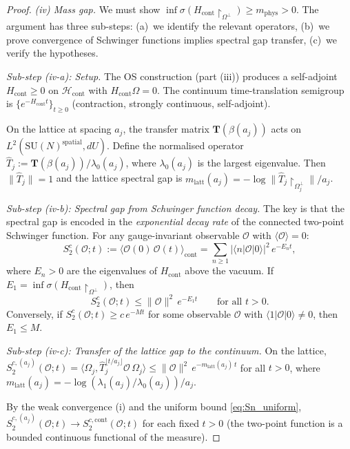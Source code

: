 \documentclass[11pt,a4paper]{amsart}
\theoremstyle{definition}
\newcommand{\SU}{\mathrm{SU}}
\begin{document}
\begin{proof}
\emph{(iv) Mass gap.}
We must show $\inf\sigma(H_{\mathrm{cont}}\restriction_{\Omega^\perp})
\ge m_{\mathrm{phys}} > 0$.
The argument has three sub-steps: (a)~we identify the relevant operators,
(b)~we prove convergence of Schwinger functions implies spectral gap transfer,
(c)~we verify the hypotheses.

\emph{Sub-step (iv-a): Setup.}
The OS construction (part (iii)) produces a self-adjoint $H_{\mathrm{cont}} \ge 0$
on $\mathcal{H}_{\mathrm{cont}}$ with $H_{\mathrm{cont}}\Omega = 0$.
The continuum time-translation semigroup is
$\{e^{-H_{\mathrm{cont}} t}\}_{t\ge 0}$ (contraction, strongly continuous,
self-adjoint).

On the lattice at spacing $a_j$, the transfer matrix $\mathbf{T}(\beta(a_j))$
acts on $L^2(\SU(N)^{\mathrm{spatial}}, dU)$.  Define the normalised operator
$\hat{T}_j := \mathbf{T}(\beta(a_j))/\lambda_0(a_j)$, where $\lambda_0(a_j)$
is the largest eigenvalue.  Then $\|\hat{T}_j\| = 1$ and the lattice
spectral gap is $m_{\mathrm{latt}}(a_j) = -\log\|\hat{T}_j\restriction_{\Omega_j^\perp}\|/a_j$.

\emph{Sub-step (iv-b): Spectral gap from Schwinger function decay.}
The key is that the spectral gap is encoded in the \emph{exponential decay rate}
of the connected two-point Schwinger function.  For any gauge-invariant
observable $\mathcal{O}$ with $\langle\mathcal{O}\rangle = 0$:
\[
  S_2^c(\mathcal{O}; t)
  := \langle \mathcal{O}(0)\,\mathcal{O}(t)\rangle_{\mathrm{cont}}
  = \sum_{n\ge 1} |\langle n|\mathcal{O}|0\rangle|^2\, e^{-E_n t},
\]
where $E_n > 0$ are the eigenvalues of $H_{\mathrm{cont}}$ above the vacuum.
If $E_1 = \inf\sigma(H_{\mathrm{cont}}\restriction_{\Omega^\perp})$, then
\begin{equation}\label{eq:S2_gap_bound}
  S_2^c(\mathcal{O}; t) \le \|\mathcal{O}\|^2\, e^{-E_1 t}
  \qquad \text{for all } t > 0.
\end{equation}
Conversely, if $S_2^c(\mathcal{O}; t) \ge c\,e^{-M t}$ for some observable
$\mathcal{O}$ with $\langle 1|\mathcal{O}|0\rangle \ne 0$, then $E_1 \le M$.

\emph{Sub-step (iv-c): Transfer of the lattice gap to the continuum.}
On the lattice, $S_2^{c,(a_j)}(\mathcal{O}; t)
= \langle\Omega_j, \hat{T}_j^{\lfloor t/a_j\rfloor}\mathcal{O}\,\Omega_j\rangle
\le \|\mathcal{O}\|^2\, e^{-m_{\mathrm{latt}}(a_j)\, t}$
for all $t > 0$, where $m_{\mathrm{latt}}(a_j) =
-\log(\lambda_1(a_j)/\lambda_0(a_j))/a_j$.

By the weak convergence (i) and the uniform bound \eqref{eq:Sn_uniform},
$S_2^{c,(a_j)}(\mathcal{O}; t) \to S_2^{c,\mathrm{cont}}(\mathcal{O}; t)$
for each fixed $t > 0$ (the two-point function is a bounded continuous
functional of the measure).


\end{proof}
\end{document}
